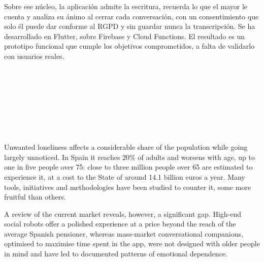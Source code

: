 Sobre ese núcleo, la aplicación admite la escritura, recuerda lo que el mayor le cuenta y analiza su ánimo al
cerrar cada conversación, con un consentimiento que solo él puede dar conforme al RGPD y sin guardar nunca la
transcripción. Se ha desarrollado en Flutter, sobre Firebase y Cloud Functions. El resultado es un prototipo
funcional que cumple los objetivos comprometidos, a falta de validarlo con usuarios reales.

\vspace{0.4cm}
\\

\chapter*{}

\thispagestyle{empty}

\begin{center}
{\large\bfseries \thetitleen}\\
\end{center}
\begin{center}
\theauthor\\
\end{center}

\vspace{0.5cm}
\\

Unwanted loneliness affects a considerable share of the population while going largely unnoticed. In Spain it
reaches 20\% of adults and worsens with age, up to one in five people over 75: close to three million people
over 65 are estimated to experience it, at a cost to the State of around 14.1 billion euros a year. Many
tools, initiatives and methodologies have been studied to counter it, some more fruitful than others.

A review of the current market reveals, however, a significant gap. High-end social robots offer a polished
experience at a price beyond the reach of the average Spanish pensioner, whereas mass-market conversational
companions, optimised to maximise time spent in the app, were not designed with older people in mind and have
led to documented patterns of emotional dependence.

